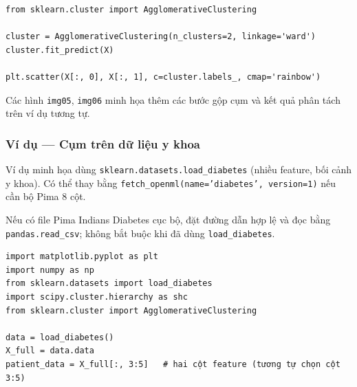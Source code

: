 \begin{vidu}[title={AgglomerativeClustering (sklearn)}]
\begin{lstlisting}
from sklearn.cluster import AgglomerativeClustering

cluster = AgglomerativeClustering(n_clusters=2, linkage='ward')
cluster.fit_predict(X)

plt.scatter(X[:, 0], X[:, 1], c=cluster.labels_, cmap='rainbow')
\end{lstlisting}
\end{vidu}

\begin{ynghia}[title={Hai cụm sau gán nhãn}]
\end{ynghia}

\begin{luuy}[title={Minh họa bổ sung}]
Các hình \texttt{img05}, \texttt{img06} minh họa thêm các bước gộp cụm và kết quả phân tách trên ví dụ tương tự.


\end{luuy}

\subsubsection{Ví dụ --- Cụm trên dữ liệu y khoa}

\begin{dongco}[title={Dataset tiểu đường}]
Ví dụ minh họa dùng \texttt{sklearn.datasets.load\_diabetes} (nhiều feature, bối cảnh y khoa). Có thể thay bằng \texttt{fetch\_openml(name='diabetes', version=1)} nếu cần bộ Pima 8 cột.
\end{dongco}

\begin{luuy}[title={Đường dẫn CSV cục bộ}]
Nếu có file Pima Indians Diabetes cục bộ, đặt đường dẫn hợp lệ và đọc bằng \texttt{pandas.read\_csv}; không bắt buộc khi đã dùng \texttt{load\_diabetes}.
\end{luuy}

\begin{vidu}[title={Nạp dữ liệu và chọn hai feature}]
\begin{lstlisting}
import matplotlib.pyplot as plt
import numpy as np
from sklearn.datasets import load_diabetes
import scipy.cluster.hierarchy as shc
from sklearn.cluster import AgglomerativeClustering

data = load_diabetes()
X_full = data.data
patient_data = X_full[:, 3:5]   # hai cột feature (tương tự chọn cột 3:5)
\end{lstlisting}
\end{vidu}

